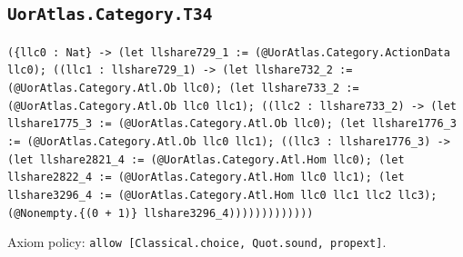 \documentclass[11pt]{article}
\begin{document}
\subsection*{\texttt{UorAtlas.Category.T34}}
\noindent\texttt{(\{llc0 : Nat\} -> (let llshare729\_1 := (@UorAtlas.Category.ActionData llc0); ((llc1 : llshare729\_1) -> (let llshare732\_2 := (@UorAtlas.Category.Atl.Ob llc0); (let llshare733\_2 := (@UorAtlas.Category.Atl.Ob llc0 llc1); ((llc2 : llshare733\_2) -> (let llshare1775\_3 := (@UorAtlas.Category.Atl.Ob llc0); (let llshare1776\_3 := (@UorAtlas.Category.Atl.Ob llc0 llc1); ((llc3 : llshare1776\_3) -> (let llshare2821\_4 := (@UorAtlas.Category.Atl.Hom llc0); (let llshare2822\_4 := (@UorAtlas.Category.Atl.Hom llc0 llc1); (let llshare3296\_4 := (@UorAtlas.Category.Atl.Hom llc0 llc1 llc2 llc3); (@Nonempty.\{(0 + 1)\} llshare3296\_4)))))))))))))}\par
\noindent Axiom policy: \texttt{allow [Classical.choice, Quot.sound, propext]}.\par
\end{document}
